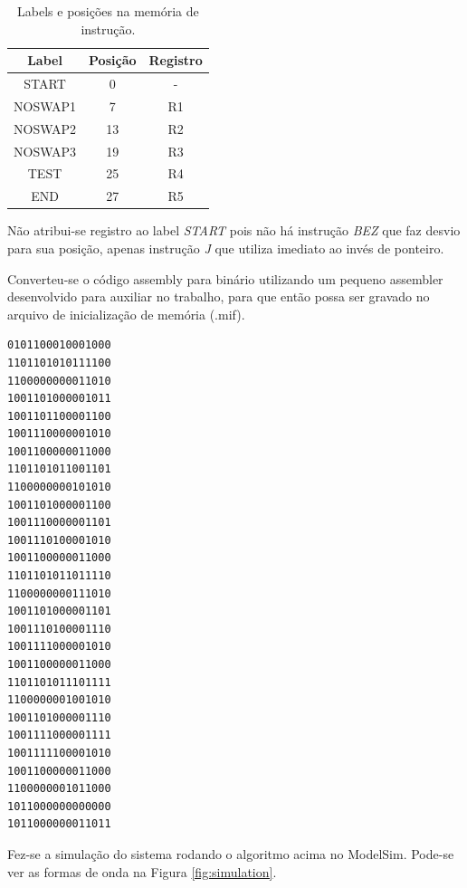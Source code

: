 \documentclass[11pt,a4paper,titlepage]{article}
\begin{document}
\begin{table}[!h]
\centering
\begin{tabular}{| c | c | c |}
\hline
Label & Posição & Registro\\
\hline
START & 0 & -\\
\hline
NOSWAP1 & 7 & R1\\
\hline
NOSWAP2 & 13 & R2\\
\hline
NOSWAP3 & 19 & R3\\
\hline
TEST & 25 & R4\\
\hline
END & 27 & R5\\
\hline
\end{tabular}
\caption{Labels e posições na memória de instrução.}
\label{tab:labels}
\end{table}
%

Não atribui-se registro ao label \textit{START} pois não há instrução \textit{BEZ} que faz desvio para sua posição, apenas instrução \textit{J} que utiliza imediato ao invés de ponteiro.

Converteu-se o código assembly para binário utilizando um pequeno assembler desenvolvido para auxiliar no trabalho, para que então possa ser gravado no arquivo de inicialização de memória (.mif).

\begin{lstlisting}
0101100010001000
1101101010111100
1100000000011010
1001101000001011
1001101100001100
1001110000001010
1001100000011000
1101101011001101
1100000000101010
1001101000001100
1001110000001101
1001110100001010
1001100000011000
1101101011011110
1100000000111010
1001101000001101
1001110100001110
1001111000001010
1001100000011000
1101101011101111
1100000001001010
1001101000001110
1001111000001111
1001111100001010
1001100000011000
1100000001011000
1011000000000000
1011000000011011
\end{lstlisting}

Fez-se a simulação do sistema rodando o algoritmo acima no ModelSim. Pode-se ver as formas de onda na Figura \ref{fig:simulation}.
\end{document}
